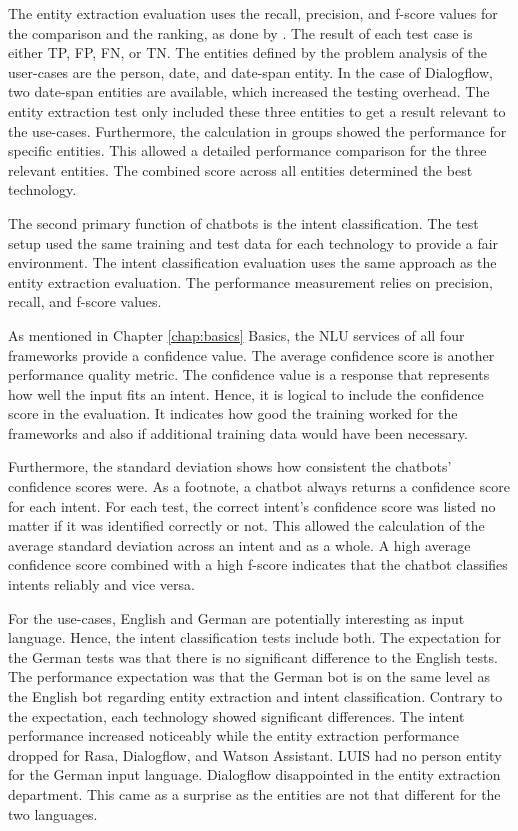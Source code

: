 The entity extraction evaluation uses the recall, precision, and f-score values for the comparison and the ranking, as done by \citet{braunEvaluatingNLU}.
The result of each test case is either TP, FP, FN, or TN.
The entities defined by the problem analysis of the user-cases are the person, date, and date-span entity.
In the case of Dialogflow, two date-span entities are available, which increased the testing overhead.
The entity extraction test only included these three entities to get a result relevant to the use-cases.
Furthermore, the calculation in groups showed the performance for specific entities. 
This allowed a detailed performance comparison for the three relevant entities.
The combined score across all entities determined the best technology.

The second primary function of chatbots is the intent classification.
The test setup used the same training and test data for each technology to provide a fair environment.
The intent classification evaluation uses the same approach as the entity extraction evaluation.
The performance measurement relies on precision, recall, and f-score values.

As mentioned in Chapter \ref{chap:basics} Basics, the NLU services of all four frameworks provide a confidence value.
The average confidence score is another performance quality metric.
The confidence value is a response that represents how well the input fits an intent.
Hence, it is logical to include the confidence score in the evaluation.
It indicates how good the training worked for the frameworks and also if additional training data would have been necessary.

Furthermore, the standard deviation shows how consistent the chatbots' confidence scores were. 
As a footnote, a chatbot always returns a confidence score for each intent.
For each test, the correct intent's confidence score was listed no matter if it was identified correctly or not.
This allowed the calculation of the average standard deviation across an intent and as a whole.
A high average confidence score combined with a high f-score indicates that the chatbot classifies intents reliably and vice versa.

For the use-cases, English and German are potentially interesting as input language.
Hence, the intent classification tests include both.
The expectation for the German tests was that there is no significant difference to the English tests.
The performance expectation was that the German bot is on the same level as the English bot regarding entity extraction and intent classification.
Contrary to the expectation, each technology showed significant differences.
The intent performance increased noticeably while the entity extraction performance dropped for Rasa, Dialogflow, and Watson Assistant.
LUIS had no person entity for the German input language.
Dialogflow disappointed in the entity extraction department.
This came as a surprise as the entities are not that different for the two languages.
 
